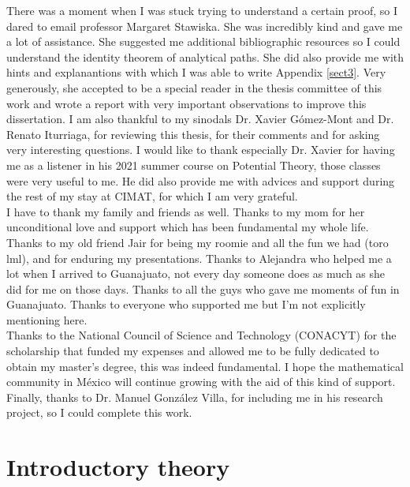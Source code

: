 \documentclass[12pt,letterpaper,twoside]{book}
\theoremstyle{definition}
\begin{document}
There was a moment when I was stuck trying to understand a certain proof, so I dared to email professor Margaret Stawiska. She was incredibly kind and gave me a lot of assistance. She suggested me additional bibliographic resources so I could understand the identity theorem of analytical paths. She did also provide me with hints and explanantions with which I was able to write Appendix \ref{sect3}. Very generously, she accepted to be a special reader in the thesis committee of this work and wrote a report with very important observations to improve this dissertation. I am also thankful to my sinodals Dr. Xavier Gómez-Mont and Dr. Renato Iturriaga, for reviewing this thesis, for their comments and for asking very interesting questions. I would like to thank especially Dr. Xavier for having me as a listener in his 2021 summer course on Potential Theory, those classes were very useful to me. He did also provide me with advices and support during the rest of my stay at CIMAT, for which I am very grateful.\\

I have to thank my family and friends as well. Thanks to my mom for her unconditional love and support which has been fundamental my whole life. Thanks to my old friend Jair for being my roomie and all the fun we had (toro lml), and for enduring my presentations. Thanks to Alejandra who helped me a lot when I arrived to Guanajuato, not every day someone does as much as she did for me on those days. Thanks to all the guys who gave me moments of fun in Guanajuato. Thanks to everyone who supported me but I'm not explicitly mentioning here.\\

Thanks to the National Council of Science and Technology (CONACYT) for the scholarship that funded my expenses and allowed me to be fully dedicated to obtain my master's degree, this was indeed fundamental. I hope the mathematical community in México will continue growing with the aid of this kind of support. Finally, thanks to Dr. Manuel González Villa, for including me in his research project, so I could complete this work.


\tableofcontents

\printnomenclature

\chapter{Introductory theory}\label{chapter1}


\end{document}
